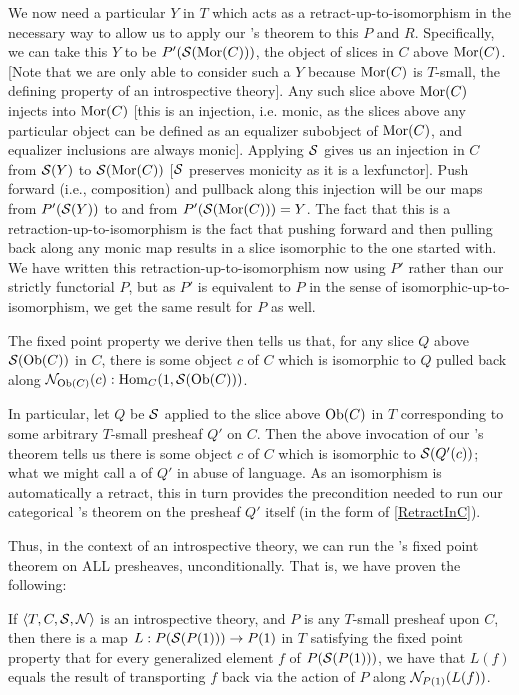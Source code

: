 We now need a particular $Y$ in $T$ which acts as a retract-up-to-isomorphism in the necessary way to allow us to apply our \Loeb's theorem to this $P$ and $R$. Specifically, we can take this $Y$ to be $P'(\mathcal{S}(\operatorname{Mor}(C)))$, the object of slices in $C$ above $\operatorname{Mor}(C)$. [Note that we are only able to consider such a $Y$ because $\operatorname{Mor}(C)$ is $T$-small, the defining property of an introspective theory]. Any such slice above $\operatorname{Mor}(C)$ injects into $\operatorname{Mor}(C)$ [this is an injection, i.e. monic, as the slices above any particular object can be defined as an equalizer subobject of $\operatorname{Mor}(C)$, and equalizer inclusions are always monic]. Applying $\mathcal{S}$ gives us an injection in $C$ from $\mathcal{S}(Y)$ to $\mathcal{S}(\operatorname{Mor}(C))$ [$\mathcal{S}$ preserves monicity as it is a lexfunctor]. Push forward (i.e., composition) and pullback along this injection will be our maps from $P'(\mathcal{S}(Y))$ to and from $P'(\mathcal{S}(\operatorname{Mor}(C))) = Y$. The fact that this is a retraction-up-to-isomorphism is the fact that pushing forward and then pulling back along any monic map results in a slice isomorphic to the one started with. We have written this retraction-up-to-isomorphism now using $P'$ rather than our strictly functorial $P$, but as $P'$ is equivalent to $P$ in the sense of isomorphic-up-to-isomorphism, we get the same result for $P$ as well. 

The fixed point property we derive then tells us that, for any slice $Q$ above $\mathcal{S}(\operatorname{Ob}(C))$ in $C$, there is some object $c$ of $C$ which is isomorphic to $Q$ pulled back along $\mathcal{N}_{\operatorname{Ob}(C)}(c) : \operatorname{Hom}_C(1, \mathcal{S}(\operatorname{Ob}(C)))$.

In particular, let $Q$ be $\mathcal{S}$ applied to the slice above $\operatorname{Ob}(C)$ in $T$ corresponding to some arbitrary $T$-small presheaf $Q'$ on $C$. Then the above invocation of our \Loeb's theorem tells us there is some object $c$ of $C$ which is isomorphic to $\mathcal{S}(Q'(c))$; what we might call a  of $Q'$ in abuse of language. As an isomorphism is automatically a retract, this in turn provides the precondition needed to run our categorical \Loeb's theorem on the presheaf $Q'$ itself (in the form of \cref{RetractInC}).

Thus, in the context of an introspective theory, we can run the \Loeb's fixed point theorem on ALL presheaves, unconditionally. That is, we have proven the following:

\label{LoebInIntrosp}
If $\langle T, C, \mathcal{S}, \mathcal{N} \rangle$ is an introspective theory, and $P$ is any $T$-small presheaf upon $C$, then there is a map $L : P(\mathcal{S}(P(1))) \to P(1)$ in $T$ satisfying the fixed point property that for every generalized element $f$ of $P(\mathcal{S}(P(1)))$, we have that $L(f)$ equals the result of transporting $f$ back via the action of $P$ along $\mathcal{N}_{P(1)}(L(f))$.

